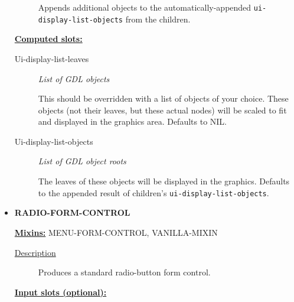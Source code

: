 \documentclass [11pt]{book}
\begin{document}
\begin{itemize}
\begin{description}
 Appends additional objects to the automatically-appended \texttt{ui-display-list-objects}
from the children.




\end{description}






\textbf{
\underline{Computed slots:}}

\begin{description}

\item [Ui-display-list-leaves]
\emph{List of GDL objects}

 This should be overridden with a list of objects of your choice. These objects (not their leaves,
but these actual nodes) will be scaled to fit and displayed in the graphics area. Defaults to NIL.




\item [Ui-display-list-objects]
\emph{List of GDL object roots}

 The leaves of these objects will be
displayed in the graphics. Defaults to the appended result of children's
\texttt{ui-display-list-objects}.




\end{description}







\item {}
\label{prim:radio-form-control}
\textbf{RADIO-FORM-CONTROL}


\textbf{
\underline{Mixins:}} MENU-FORM-CONTROL, VANILLA-MIXIN





\begin{description}

\item [
\underline{Description}]


Produces a standard radio-button form control.



\end{description}








\textbf{
\underline{Input slots (optional):}}


\end{itemize}
\end{document}

